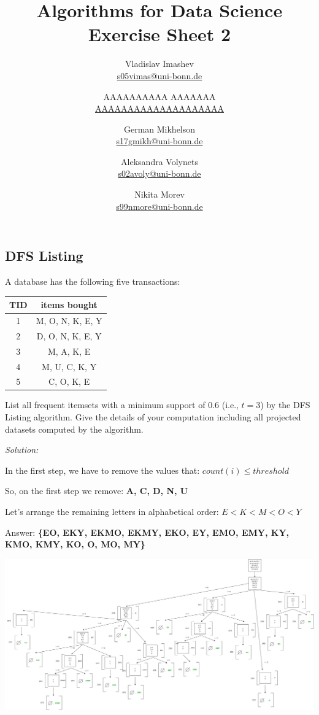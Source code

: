 \documentclass{article}
\title{Algorithms for Data Science \\ Exercise Sheet 2}
\author{
  Vladislav Imashev \\ \href{mailto:s05vimas@uni-bonn.de}{s05vimas@uni-bonn.de} \and
  AAAAAAAAAA AAAAAAA \\ \href{mailto:AAAAAAAAAAAAAAAAAAAA}{AAAAAAAAAAAAAAAAAAAA} \and
  German Mikhelson \\ \href{mailto:s17gmikh@uni-bonn.de}{s17gmikh@uni-bonn.de} \and
  Aleksandra Volynets \\ \href{mailto:s02avoly@uni-bonn.de}{s02avoly@uni-bonn.de} \and
  Nikita Morev \\ \href{mailto:s99nmore@uni-bonn.de}{s99nmore@uni-bonn.de}
}
\begin{document}
  \maketitle

  \setcounter{section}{2}
  \subsection{DFS Listing}
  \begin{centerframebox}
    A database has the following five transactions:

    \begin{center}
      \begin{tabular}{|c|c|}
        \hline
        TID & items bought \\ \hline
        1 & M, O, N, K, E, Y \\ \hline
        2 & D, O, N, K, E, Y \\ \hline
        3 & M, A, K, E \\ \hline
        4 & M, U, C, K, Y \\ \hline
        5 & C, O, K, E \\ \hline
      \end{tabular}
    \end{center}

    List all frequent itemsets with a minimum support of $0.6$ (i.e., $t = 3$) by the
    DFS Listing algorithm. Give the details of your computation including all projected datasets computed by the algorithm.
  \end{centerframebox}
  \textit{Solution:}

  In the first step, we have to remove the values that: $count(i) \leq threshold$

  So, on the first step we remove: \textbf{A, C, D, N, U}

  Let's arrange the remaining letters in alphabetical order:
  $E < K < M < O < Y$

  Answer: \textbf{\{EO, EKY, EKMO, EKMY, EKO, EY, EMO, EMY, KY, KMO, KMY, KO, O, MO, MY\}}

  \begin{adjustwidth}{-0.5in}{-0.5in}
    \centering
    \includegraphics[width=1.13\textwidth]{Task1_DS.png}
  \end{adjustwidth}
\end{document}
